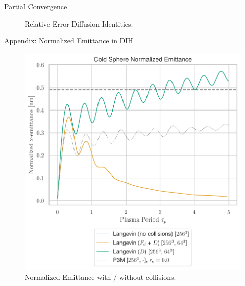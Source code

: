 \begin{frame}[c]{Partial Convergence}
\begin{multicols}{2}
\begin{figure}[!htb]
      \caption{Relative Error Diffusion Identities.}
      \label{fig:identities_convergence}
    \end{figure}
    \end{multicols}
\end{frame}

\begin{frame}[c]{Appendix: Normalized Emittance in DIH}
    \begin{figure}[!htb]
        \centering
        \captionsetup{justification=centering}
      \includegraphics[width=0.7\linewidth]{figures/emittance.pdf}
      \caption{Normalized Emittance with / without collisions.}
      \label{fig:emittance}
    \end{figure}
\end{frame}


